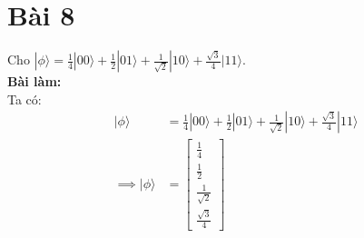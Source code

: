 \section{Bài 8}
Cho $|\phi\rangle=\frac{1}{4}|00\rangle+\frac{1}{2}|01\rangle+\frac{1}{\sqrt{2}}|10\rangle+\frac{\sqrt{3}}{4}|11\rangle$.\\
\textbf{Bài làm:}\\
Ta có:
\begin{align*}
    |\phi\rangle          & =\frac{1}{4}|00\rangle+\frac{1}{2}|01\rangle+\frac{1}{\sqrt{2}}|10\rangle+\frac{\sqrt{3}}{4}|11\rangle \\
    \implies |\phi\rangle & = \begin{bmatrix}
                                  \frac{1}{4}        \\
                                  \frac{1}{2}        \\
                                  \frac{1}{\sqrt{2}} \\
                                  \frac{\sqrt{3}}{4}
                              \end{bmatrix}
\end{align*}

